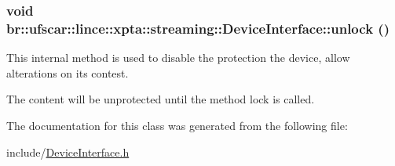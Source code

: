 \hypertarget{classbr_1_1ufscar_1_1lince_1_1xpta_1_1streaming_1_1DeviceInterface_a2bf3b1a64cf40a9f7e6bad2908a53e9c}{
\subsubsection[{unlock}]{\setlength{\rightskip}{0pt plus 5cm}void br::ufscar::lince::xpta::streaming::DeviceInterface::unlock ()}}
\label{classbr_1_1ufscar_1_1lince_1_1xpta_1_1streaming_1_1DeviceInterface_a2bf3b1a64cf40a9f7e6bad2908a53e9c}


This internal method is used to disable the protection the device, allow alterations on its contest. 

The content will be unprotected until the method lock is called. 

The documentation for this class was generated from the following file:\begin{DoxyCompactItemize}
\item 
include/\hyperlink{DeviceInterface_8h}{DeviceInterface.h}\end{DoxyCompactItemize}
